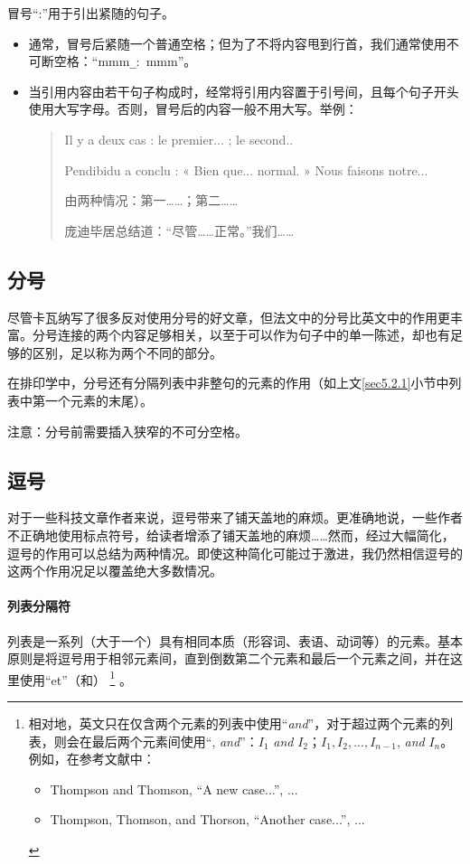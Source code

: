 冒号``:''用于引出紧随的句子。

\begin{itemize}
    \item 通常，冒号后紧随一个普通空格；但为了不将内容甩到行首，我们通常使用不可断空格：``mmm\verb|_|:\verb*+ +mmm''。
    \item 当引用内容由若干句子构成时，经常将引用内容置于引号间，且每个句子开头使用大写字母。否则，冒号后的内容一般不用大写。举例：
    
    \begin{quote}
        Il y a deux cas : le premier... ; le second..
        
        Pendibidu a conclu : « Bien que... normal. » Nous faisons notre...

        \begin{bil}
            由两种情况：第一……；第二……

            庞迪毕居总结道：``尽管……正常。''我们……
        \end{bil}
    \end{quote}
\end{itemize}

\subsection{分号}

尽管卡瓦纳写了很多反对使用分号的好文章，但法文中的分号比英文中的作用更丰富。分号连接的两个内容足够相关，以至于可以作为句子中的单一陈述，却也有足够的区别，足以称为两个不同的部分。

在排印学中，分号还有分隔列表中非整句的元素的作用（如上文\ref{sec5.2.1}小节中列表中第一个元素的末尾）。

注意：分号前需要插入狭窄的不可分空格。

\subsection{逗号}

对于一些科技文章作者来说，逗号带来了铺天盖地的麻烦。更准确地说，一些作者不正确地使用标点符号，给读者增添了铺天盖地的麻烦……然而，经过大幅简化，逗号的作用可以总结为两种情况。即使这种简化可能过于激进，我仍然相信逗号的这两个作用况足以覆盖绝大多数情况。

\paragraph{列表分隔符} 列表是一系列（大于一个）具有相同本质（形容词、表语、动词等）的元素。基本原则是将逗号用于相邻元素间，直到倒数第二个元素和最后一个元素之间，并在这里使用``et''（和）
    \footnote{相对地，英文只在仅含两个元素的列表中使用``\emph{and}''，对于超过两个元素的列表，则会在最后两个元素间使用``, \emph{and}''：$I_1$ \emph{and} $I_2$；$I_1, I_2, ... , I_{n-1}$, \emph{and} $I_n$。例如，在参考文献中：
    \begin{itemize}
        \item Thompson and Thomson, ``A new case...'', ...
        \item Thompson, Thomson, and Thorson, ``Another case...'', ...
    \end{itemize}
    }
。

